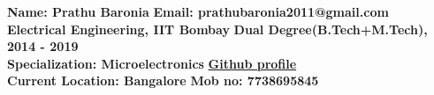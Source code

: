 {\bf Name: Prathu Baronia}               \hfill {\bf Email: prathubaronia2011@gmail.com}\\
{\bf Electrical Engineering, IIT Bombay} \hfill {\bf Dual Degree(B.Tech+M.Tech), 2014 - 2019}\\
{\bf Specialization: Microelectronics}   \hfill {\bf \href{https://github.com/praton1729}{Github profile}}\\
{\bf Current Location: Bangalore}        \hfill {\bf Mob no: 7738695845}\\
